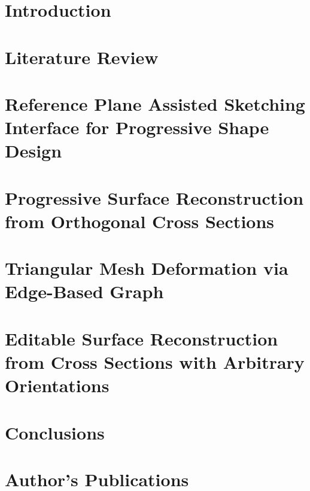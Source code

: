 \documentclass{puthesis}
\author{WANG KAI}
\begin{document}
\pagestyle{fancy}
\fancyhead{}
\fancyhead[R]{\nouppercase{\small\bfseries\rightmark}}


\chapter{Introduction}\label{ch:introduction}


\chapter{Literature Review}\label{ch:review}


\chapter{Reference Plane Assisted Sketching Interface for Progressive Shape Design}\label{ch:planeSBIM}


\chapter{Progressive Surface Reconstruction from Orthogonal Cross Sections}\label{ch:orthsurf}


\chapter{Triangular Mesh Deformation via Edge-Based Graph}\label{ch:flexdeformation}



\chapter{Editable Surface Reconstruction from Cross Sections with Arbitrary Orientations}\label{ch:editsurf}



\chapter{Conclusions}\label{ch:conclusion}



\clearpage
\renewcommand{\bibname}{References}




\clearpage
{}
\chapter*{Author's Publications}

\end{document}
